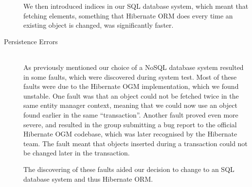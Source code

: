 \begin{description}
        We then introduced indices in our SQL database system, which meant that fetching elements, something that Hibernate ORM does every time an existing object is changed, was significantly faster.
    \item[Persistence Errors]\hfill \\
        As previously mentioned our choice of a NoSQL database system resulted in some faults, which were discovered during system test.
        Most of these faults were due to the Hibernate OGM implementation, which we found unstable.
        One fault was that an object could not be fetched twice in the same entity manager context, meaning that we could now use an object found earlier in the same \enquote{transaction}.
        Another fault proved even more severe, and resulted in the group submitting a bug report to the official Hibernate OGM codebase, which was later recognised by the Hibernate team.
        The fault meant that objects inserted during a transaction could not be changed later in the transaction.

        The discovering of these faults aided our decision to change to an SQL database system and thus Hibernate ORM.
\end{description}
